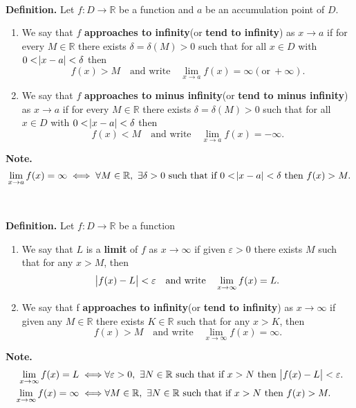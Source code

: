 \documentclass[12pt,a4paper]{article}
\begin{document}
\
\begin{tcolorbox}[colback=white]
	\textbf{Definition.} Let $f:D\to\mathbb{R}$ be a function and $a$ be an accumulation point of $D$.\begin{enumerate}
		\item We say that $f$ \textbf{approaches to infinity}(or \textbf{tend to infinity}) as $x\longrightarrow a$ if for every $M\in\mathbb{R}$ there exists $\delta=\delta(M)>0$ such that for all $x\in D$ with $0<\abs{x-a}<\delta$ then \[
		f(x)>M\quad\text{and write}\quad\lim\limits_{x\to a}f(x)=\infty(\text{or}\ +\infty).
		\]
		\item We say that $f$ \textbf{approaches to minus infinity}(or \textbf{tend to minus infinity}) as $x\longrightarrow a$ if for every $M\in\mathbb{R}$ there exists $\delta=\delta(M)>0$ such that for all $x\in D$ with $0<\abs{x-a}<\delta$ then \[
		f(x)<M\quad\text{and write}\quad\lim\limits_{x\to a}f(x)=-\infty.
		\]
	\end{enumerate}\tcblower
	\textbf{Note.} \[
	\lim\limits_{x\to a}f(x)=\infty\iff\forall M\in\mathbb{R},\ \exists\delta>0\ \text{such that if}\ 0<\abs{x-a}<\delta\ \text{then}\ f(x)>M.
	\]
\end{tcolorbox}
\
\begin{tcolorbox}[colback=white]
	\textbf{Definition.} Let $f:D\to\mathbb{R}$ be a function \begin{enumerate}
		\item We say that $L$ is a \textbf{limit} of $f$ as $x\longrightarrow\infty$ if given $\varepsilon>0$ there exists $M$ such that for any $x>M$, then \[
		\abs{f(x)-L}<\varepsilon\quad\text{and write}\quad \lim\limits_{x\to\infty}f(x)=L.
		\]
		\item We say that f \textbf{approaches to infinity}(or \textbf{tend to infinity}) as $x\longrightarrow\infty$ if given any $M\in\mathbb{R}$ there exists $K\in\mathbb{R}$ such that for any $x>K$, then \[
		f(x)>M\quad\text{and write}\quad \lim\limits_{x\to\infty}f(x)=\infty.
		\]
	\end{enumerate}\tcblower
	\textbf{Note.} \begin{align*}
	\lim\limits_{x\to \infty}f(x)=L\iff&\forall\varepsilon>0,\ \exists N\in\mathbb{R}\ \text{such that if}\ x>N\ \text{then}\ \abs{f(x)-L}<\varepsilon. \\
	\lim\limits_{x\to \infty}f(x)=\infty\iff&\forall M\in\mathbb{R},\ \exists N\in\mathbb{R}\ \text{such that if}\ x>N\ \text{then}\ f(x)>M.
	\end{align*}
\end{tcolorbox}
\end{document}
